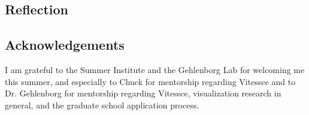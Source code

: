 \documentclass[12pt, letterpaper]{article}
\begin{document}
\subsection{Reflection}


\subsection*{Acknowledgements}
I am grateful to the Summer Institute and the Gehlenborg Lab for welcoming me this summer, and especially to Chuck for mentorship regarding Vitessce and to Dr. Gehlenborg for mentorship regarding Vitessce, visualization research in general, and the graduate school application process.


{}

\end{document}

